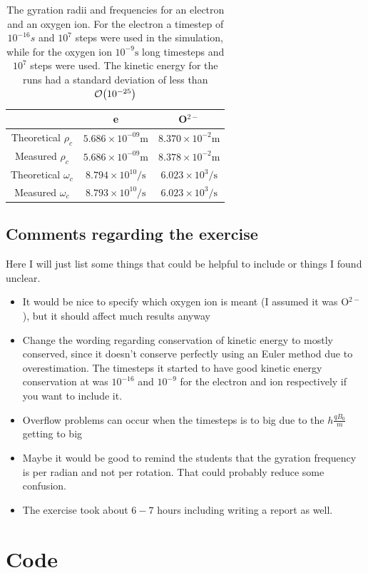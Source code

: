 \documentclass[x11names]{article}
\begin{document}
            \begin{table}
                  \centering
                  \begin{tabular}{| c |c | c |}
                        \hline
                                                & e   & O\(^{2-}\)
                        \\ \hline
                        Theoretical $\rho_c$    &  $5.686 \times 10^{-09} \si{\meter}$   &    $8.370 \times 10 ^{-2} \si{\meter}$ 
                        \\ \hline
                        Measured $\rho_c$       &  $5.686 \times 10^{-09} \si{\meter}$  &     $8.378 \times 10 ^{-2} \si{\meter}$ 
                        \\ \hline
                        Theoretical \(\omega_c\)&  $8.794 \times 10^{10} \si{\per\second} $  & $ 6.023 \times 10 ^{3}\si{\per\second} $
                        \\ \hline
                        Measured \(\omega_c\)   &  $ 8.793\times 10^{10} \si{\per\second}$  &  $ 6.023 \times 10 ^{3} \si{\per\second}$
                        \\ \hline
                  \end{tabular}
                  \caption{The gyration radii and frequencies for an electron and an oxygen ion. For the electron a timestep of \( 10^{-16} \si{s} \) and \(10^7\) steps were used in the simulation, while for the oxygen ion \(  10^{-9} \si{\second } \) long timesteps and \(10^7\) steps were used. The kinetic energy for the runs had a standard deviation of less than \(\order{10^{-25}}\)}
                  \label{tab:results}
            \end{table}

\subsection{Comments regarding the exercise}
      Here I will just list some things that could be helpful to include or things I found unclear.

      \begin{itemize}
            \item It would be nice to specify which oxygen ion is meant (I assumed it was O\(^{2-}\)), but it should affect much results anyway
            \item Change the wording regarding conservation of kinetic energy to mostly conserved, since it doesn't conserve perfectly using an Euler method due to overestimation. The timesteps it started to have good kinetic energy conservation at was \(10^{-16}\) and \( 10^{-9} \) for the electron and ion respectively if you want to include it.
            \item Overflow problems can occur when the timesteps is to big due to the \(  h\frac{qB_0}{m}  \) getting to big
            \item Maybe it would be good to remind the students that the gyration frequency is per radian and not per rotation. That could probably reduce some confusion.
            \item The exercise took about $6-7$ hours including writing a report as well.
      \end{itemize}

\appendix
\section{Code}
      

      
\end{document}
